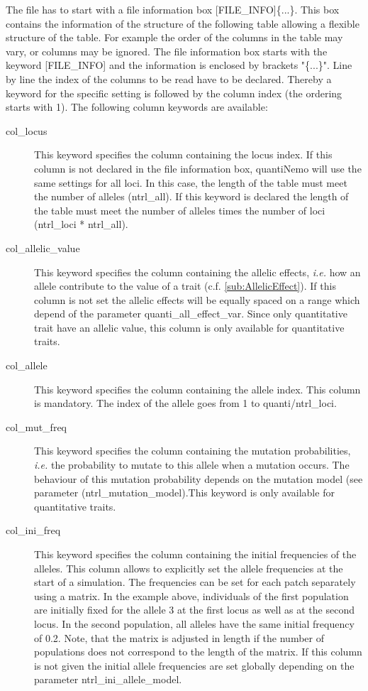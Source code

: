 \documentclass[letterpaper,12pt,oneside]{book}
\begin{document}
\begin{description}
The file has to start with a file information box \textsf{[FILE\_INFO]}\{...\}. This box contains the information of the structure of the following table allowing a flexible structure of the table. For example the order of the columns in the table may vary, or columns may be ignored. The file information box starts with the keyword \textsf{[FILE\_INFO]} and the information is enclosed by brackets "\{...\}". Line by line the index of the columns to be read have to be declared. Thereby a keyword for the specific setting is followed by the column index (the ordering starts with 1). The following column keywords are available:
\begin{description}
\item [col\_locus] This keyword specifies the column containing the locus index. If this column is not declared in the file information box, quantiNemo will use the same settings for all loci. In this case, the length of the table must meet the number of alleles (\textsf{ntrl\_all}). If this keyword is declared the length of the table must meet the number of alleles times the number of loci (\textsf{ntrl\_loci} * \textsf{ntrl\_all}).   
\item [col\_allelic\_value] This keyword specifies the column containing the allelic effects, \textit{i.e.} how an allele contribute to the value of a trait (c.f. \ref{sub:AllelicEffect}). If this column is not set the allelic effects will be equally spaced on a range which depend of the parameter \textsf{quanti\_all\_effect\_var}. Since only quantitative trait have an allelic value, this column is only available for quantitative traits.
\item [col\_allele] This keyword specifies the column containing the allele index. This column is mandatory. The index of the allele goes from 1 to \textsf{quanti/ntrl\_loci}.
\item [col\_mut\_freq] This keyword specifies the column containing the mutation probabilities, \textit{i.e.} the probability to mutate to this allele when a mutation occurs. The behaviour of this mutation probability depends on the mutation model (see parameter (\textsf{ntrl\_mutation\_model}).This keyword is only available for quantitative traits. 
\item [col\_ini\_freq] This keyword specifies the column containing the initial frequencies of the alleles. This column allows to explicitly set the allele frequencies at the start of a simulation. The frequencies can be set for each patch separately using a matrix. In the example above, individuals of the first population are initially fixed for the allele 3 at the first locus as well as at the second locus. In the second population, all alleles have the same initial frequency of 0.2. Note, that the matrix is adjusted in length if the number of populations does not correspond to the length of the matrix. If this column is not given the initial allele frequencies are set globally depending on the parameter \textsf{ntrl\_ini\_allele\_model}.

\end{description}
\end{description}
\end{document}
